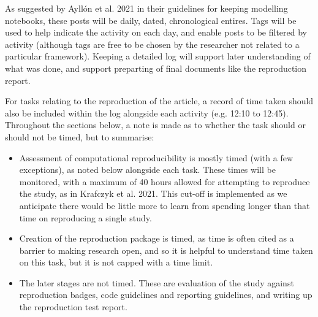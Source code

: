 As suggested by Ayllón et al. 2021\autocite{ayllon_keeping_2021} in their guidelines for keeping modelling notebooks, these posts will be daily, dated, chronological entires. Tags will be used to help indicate the activity on each day, and enable posts to be filtered by activity (although tags are free to be chosen by the researcher not related to a particular framework). Keeping a detailed log will support later understanding of what was done, and support preparting of final documents like the reproduction report.

For tasks relating to the reproduction of the article, a record of time taken should also be included within the log alongside each activity (e.g. 12:10 to 12:45). Throughout the sections below, a note is made as to whether the task should or should not be timed, but to summarise:
\begin{itemize}
    \item Assessment of computational reproducibility is mostly timed (with a few exceptions), as noted below alongside each task. These times will be monitored, with a maximum of 40 hours allowed for attempting to reproduce the study, as in Krafczyk et al. 2021.\autocite{krafczyk_learning_2021} This cut-off is implemented as we anticipate there would be little more to learn from spending longer than that time on reproducing a single study.
    \item Creation of the reproduction package is timed, as time is often cited as a barrier to making research open, and so it is helpful to understand time taken on this task, but it is not capped with a time limit.
    \item The later stages are not timed. These are evaluation of the study against reproduction badges, code guidelines and reporting guidelines, and writing up the reproduction test report.
\end{itemize}